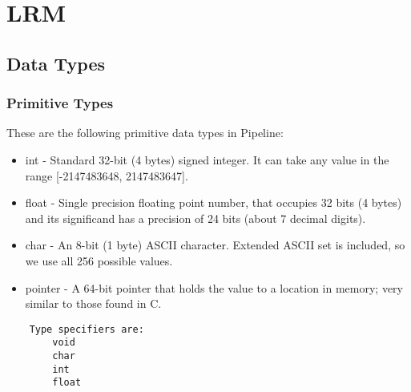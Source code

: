 \documentclass[./LRM_main.tex]{subfiles}
\begin{document}


\chapter{LRM}
\section{Data Types}



\subsection{Primitive Types}
These are the following primitive data types in Pipeline:
\begin{itemize}
    \item int -  Standard 32-bit (4 bytes) signed integer. It can take any value in the range [-2147483648, 2147483647].
    \item float - Single precision floating point number, that occupies 32 bits (4 bytes) and its significand has a precision of 24 bits (about 7 decimal digits). 
    \item char - An 8-bit (1 byte) ASCII character. Extended ASCII set is included, so we use all 256 possible values.
    \item pointer - A 64-bit pointer that holds the value to a location in memory; very similar to those found in C.
\end{itemize}
\begin{lstlisting}
	Type specifiers are:
        void
        char
        int
        float

\end{lstlisting}
\end{document}
